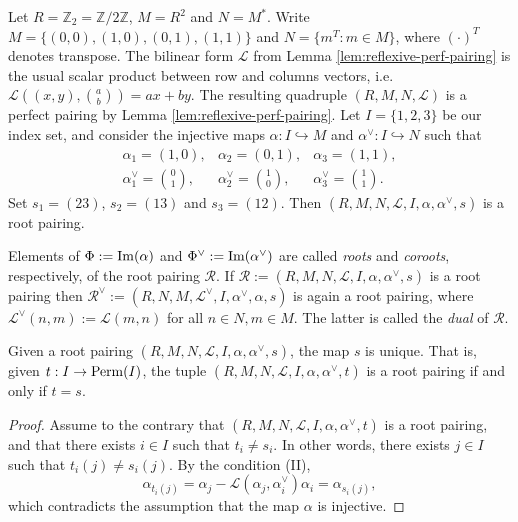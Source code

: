 \begin{example}
    \label{eg:eg:ZmodTwoSquared-perf-pairing}
    Let $R=\mathbb{Z}_2 = \mathbb{Z}/2\mathbb{Z}$, $M=R^2$ and $N=M^*$. Write $ M=\{(0,0), (1,0), (0,1), (1,1)\}$ and $N = \{m^T : m \in M\}$, where $(\cdot )^T$ denotes transpose. The bilinear form $\mathcal{L}$ from Lemma \ref{lem:reflexive-perf-pairing} is the usual scalar product between row and columns vectors, i.e. $\mathcal{L}((x,y),{a\choose b})  = ax+by$.
    The resulting quadruple $(R,M,N,\mathcal{L})$ is a perfect pairing by Lemma \ref{lem:reflexive-perf-pairing}.    
    Let $I=\{1,2,3\}$ be our index set, and consider the injective maps $\alpha:I\hookrightarrow M$ and $\alpha^\vee:I\hookrightarrow N$ such that
    \begin{equation*}
        \begin{array}{ccc}
            \alpha_1 = (1,0), & \alpha_2 = (0,1), & \alpha_3 = (1,1), \\
            \alpha^\vee_1 = {0\choose 1}, & \alpha^\vee_2 = {1\choose 0}, &\alpha^\vee_3 = {1\choose 1}.
        \end{array}
    \end{equation*}
    Set $s_1 = (2 3)$, $s_2 = (13)$ and $s_3 = (12)$. Then $(R,M,N,\mathcal{L},I,\alpha,\alpha^\vee,s)$ is a root pairing.
\end{example}


Elements of $\Phi := {\rm Im}(\alpha)$ and $\Phi^\vee := {\rm Im}(\alpha^\vee)$ are called {\it roots} and {\it coroots}, 
respectively, of the root pairing $\mathcal{R}$. If $\mathcal{R} := (R,M,N,\mathcal{L},I,\alpha, \alpha^\vee,s)$ is 
a root pairing then $\mathcal{R}^\vee := (R,N,M,\mathcal{L}^\vee,I,\alpha^\vee, \alpha,s)$ is again 
a root pairing, where $\mathcal{L}^\vee (n,m) := \mathcal{L}(m,n)$ for all $n \in N,m \in M$. The 
latter is called the {\it dual} of $\mathcal{R}$. 

\begin{lemma}
    \label{lem:reflection_perm_unique}
    \leanok
    Given a root pairing $(R,M,N,\mathcal{L},I,\alpha, \alpha^\vee, s)$, the map $s$ is unique. 
    That is, given $t : I \to {\rm Perm}(I)$, the tuple $(R,M,N,\mathcal{L},I,\alpha, \alpha^\vee, t)$
    is a root pairing if and only if $t = s$.
\end{lemma}
\begin{proof}
    \leanok
    Assume to the contrary that $(R,M,N,\mathcal{L},I,\alpha, \alpha^\vee, t)$ is a root pairing, and that 
    there exists $i \in I$ such that $t_i \neq s_i$. In other words, there exists $j \in I$ such that
    $t_i(j) \neq s_i(j)$. By the condition (II),
    \[
        \alpha_{t_i(j)} = \alpha_j - \mathcal{L}(\alpha_j,\alpha^\vee_i)\alpha_i = \alpha_{s_i(j)},
    \]
    which contradicts the assumption that the map $\alpha$ is injective.
\end{proof}


